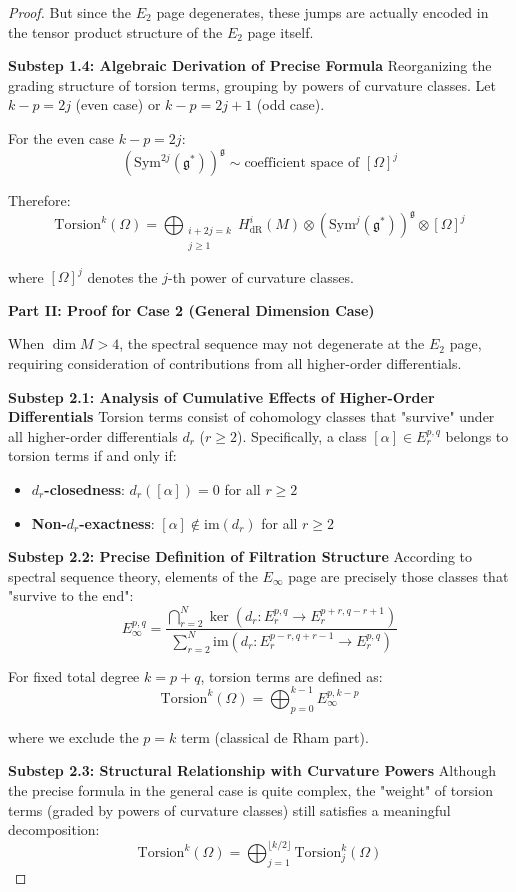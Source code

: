\documentclass[a4paper,12pt]{extarticle}
\theoremstyle{definition}
\begin{document}
\begin{proof}
But since the $E_2$ page degenerates, these jumps are actually encoded in the tensor product structure of the $E_2$ page itself.

\textbf{Substep 1.4: Algebraic Derivation of Precise Formula}
Reorganizing the grading structure of torsion terms, grouping by powers of curvature classes. Let $k-p = 2j$ (even case) or $k-p = 2j+1$ (odd case).

For the even case $k-p = 2j$:
$$(\text{Sym}^{2j}(\mathfrak{g}^*))^\mathfrak{g} \sim \text{coefficient space of }[\Omega]^j$$

Therefore:
$$\text{Torsion}^k(\Omega) = \bigoplus_{\substack{i+2j=k \\ j \geq 1}} H^i_{\text{dR}}(M) \otimes (\text{Sym}^j(\mathfrak{g}^*))^\mathfrak{g} \otimes [\Omega]^j$$

where $[\Omega]^j$ denotes the $j$-th power of curvature classes.

\textbf{Part II: Proof for Case 2 (General Dimension Case)}

When $\dim M > 4$, the spectral sequence may not degenerate at the $E_2$ page, requiring consideration of contributions from all higher-order differentials.

\textbf{Substep 2.1: Analysis of Cumulative Effects of Higher-Order Differentials}
Torsion terms consist of cohomology classes that "survive" under all higher-order differentials $d_r$ ($r \geq 2$). Specifically, a class $[\alpha] \in E_r^{p,q}$ belongs to torsion terms if and only if:
\begin{itemize}
\item \textbf{$d_r$-closedness}: $d_r([\alpha]) = 0$ for all $r \geq 2$
\item \textbf{Non-$d_r$-exactness}: $[\alpha] \notin \text{im}(d_r)$ for all $r \geq 2$
\end{itemize}

\textbf{Substep 2.2: Precise Definition of Filtration Structure}
According to spectral sequence theory, elements of the $E_\infty$ page are precisely those classes that "survive to the end":
$$E_\infty^{p,q} = \frac{\bigcap_{r=2}^N \ker(d_r: E_r^{p,q} \to E_r^{p+r,q-r+1})}{\sum_{r=2}^N \text{im}(d_r: E_r^{p-r,q+r-1} \to E_r^{p,q})}$$

For fixed total degree $k = p+q$, torsion terms are defined as:
$$\text{Torsion}^k(\Omega) = \bigoplus_{p=0}^{k-1} E_\infty^{p,k-p}$$

where we exclude the $p = k$ term (classical de Rham part).

\textbf{Substep 2.3: Structural Relationship with Curvature Powers}
Although the precise formula in the general case is quite complex, the "weight" of torsion terms (graded by powers of curvature classes) still satisfies a meaningful decomposition:
$$\text{Torsion}^k(\Omega) = \bigoplus_{j=1}^{\lfloor k/2 \rfloor} \text{Torsion}^k_j(\Omega)$$


\end{proof}
\end{document}
